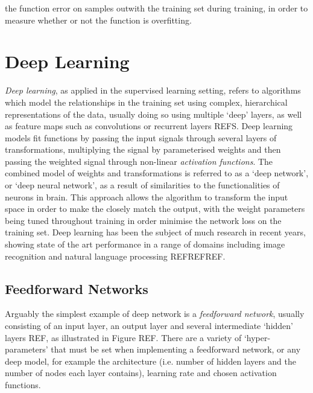 the function error on samples outwith the training set during training, in order to measure whether or not the function is overfitting. 

\section{Deep Learning}
\textit{Deep learning}, as applied in the supervised learning setting, refers to algorithms which model the relationships in the training set using complex, hierarchical representations of the data, usually doing so using multiple `deep' layers, as well as feature maps such as convolutions or recurrent layers REFS. Deep learning models fit functions by passing the input signals through several layers of transformations, multiplying the signal by parameterised weights and then passing the weighted signal through non-linear \textit{activation functions}. The combined model of weights and transformations is referred to as a `deep network', or `deep neural network', as a result of similarities to the functionalities of neurons in brain. This approach allows the algorithm to transform the input space in order to make the closely match the output, with the weight parameters being tuned throughout training in order minimise the network loss on the training set. Deep learning has been the subject of much research in recent years, showing state of the art performance in a range of domains including image recognition and natural language processing REFREFREF.
\subsection{Feedforward Networks}
Arguably the simplest example of deep network is a \textit{feedforward network}, usually consisting of an input layer, an output layer and several intermediate `hidden' layers REF, as illustrated in Figure REF. There are a variety of `hyper-parameters' that must be set when implementing a feedforward network, or any deep model, for example the architecture (i.e. number of hidden layers and the number of nodes each layer contains), learning rate and chosen activation functions.

